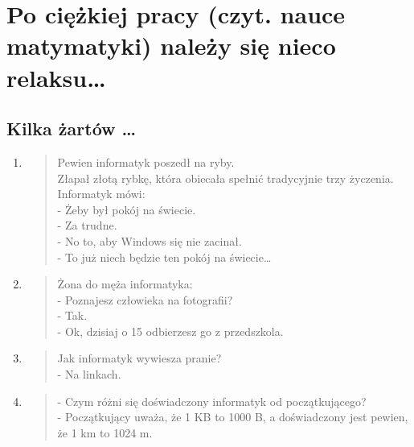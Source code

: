 \documentclass[a4paper,12pt]{article}
\begin{document}
\section{Po ciężkiej pracy (czyt. nauce matymatyki) należy się nieco relaksu\ldots}
\label{sec:PoCiezkiejPracyNalezySieNiecoRelaksu}
\subsection{Kilka żartów \ldots}
\label{subsec:KilkaZartow}
\begin{enumerate}
\item \begin{flushleft}
\begin{verse}
Pewien informatyk poszedł na ryby. \\
Złapał złotą rybkę, która obiecała spełnić tradycyjnie trzy życzenia. \\
Informatyk mówi: \\
- Żeby był pokój na świecie. \\
- Za trudne. \\
- No to, aby Windows się nie zacinał. \\
- To już niech będzie ten pokój na świecie\ldots \\
\end{verse}
\end{flushleft}
\cite{kawal1}

\item \begin{flushleft}
\begin{verse}
Żona do męża informatyka: \\
- Poznajesz człowieka na fotografii? \\
- Tak. \\
- Ok, dzisiaj o 15 odbierzesz go z przedszkola. \\
\end{verse}
\end{flushleft}
\cite{kawal2}

\item \begin{flushleft}
\begin{verse}
Jak informatyk wywiesza pranie? \\
- Na linkach. \\
\end{verse}
\end{flushleft}
\cite{kawal3}

\item \begin{flushleft}
\begin{verse}
- Czym różni się doświadczony informatyk od początkującego? \\
- Początkujący uważa, że 1 KB to 1000 B, a doświadczony jest pewien, że 1 km to 1024 m. \\
\end{verse}
\end{flushleft}
\cite{kawal4}


\end{enumerate}
\end{document}

